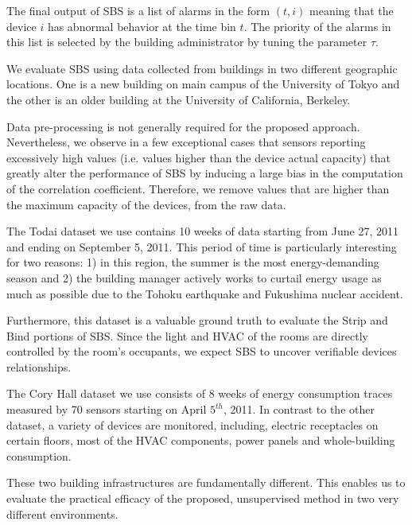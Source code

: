 The final output of SBS is a list of alarms in the form $(t,i)$ meaning that the device $i$ has abnormal behavior at the time bin $t$.
The priority of the alarms in this list is selected by the building administrator by tuning the parameter $\tau$.





We evaluate SBS using data collected from buildings in two different geographic locations.  
One is a new building on main campus of the University of Tokyo and the other is an older building at 
the University of California, Berkeley.

Data pre-processing is not generally required for the proposed approach.  
Nevertheless, we observe in a few exceptional cases that sensors reporting excessively high values (i.e. values higher than the device actual capacity) that  greatly alter the performance of SBS by inducing a large bias in the computation of the correlation coefficient.
Therefore, we remove values that are higher than the maximum capacity of the devices, from the raw data.




The Todai dataset we use contains 10 weeks of data starting from June 27, 2011 and ending on September 5, 2011.
This period of time is particularly interesting for two reasons: 1) in this region, the summer is the most energy-demanding 
season and 2) the building manager actively works to curtail energy usage as much as possible due to the 
Tohoku earthquake and Fukushima nuclear accident.

Furthermore, this dataset is a valuable ground truth to evaluate the Strip and Bind portions of SBS.
Since the light and HVAC of the rooms are directly controlled by the room's occupants, we expect SBS to uncover verifiable devices 
relationships.  


The Cory Hall dataset we use consists of 8 weeks of energy consumption traces measured by 70 sensors starting on April $5^{th}$, 2011.
In contrast to the other dataset, a variety of devices are monitored, including, electric receptacles on certain floors, most of the HVAC components, 
 power panels and whole-building consumption.

These two building infrastructures are fundamentally different.  
This enables us to evaluate the practical efficacy of the proposed, unsupervised method in two very different environments.


